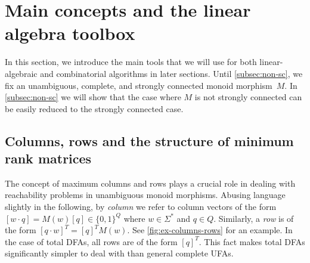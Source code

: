 \documentclass[11pt,a4paper]{amsart}
\theoremstyle{plain}
\theoremstyle{definition}
\theoremstyle{defC}
\theoremstyle{thmC}
\theoremstyle{plain}
\numberwithin{equation}{section}
\begin{document}
\section{Main concepts and the linear algebra toolbox}\label{sec-toolbox}
In this section, we introduce the main tools that we will use for both linear-algebraic and combinatorial algorithms in later sections.
Until \autoref{subsec:non-sc}, we fix an unambiguous, complete, and strongly connected monoid morphism~$M$. In \autoref{subsec:non-sc} we will show that the case where $M$ is not strongly connected can be easily reduced to the strongly connected case.


\subsection{Columns, rows and the structure of minimum rank matrices}\label{subsec:col-row-defs}

The concept of maximum columns and rows plays a crucial role in dealing with reachability problems in unambiguous monoid morphisms. Abusing language slightly in the following, by \emph{column} we refer to column vectors of the form $[w \cdot q] = M(w)[q] \in \{0,1\}^Q$ where $w \in \Sigma^*$ and $q \in Q$.
Similarly, a \emph{row} is of the form $[q \cdot w]^T = [q]^T M(w)$. See \autoref{fig:ex-columns-rows} for an example. In the case of total DFAs, all rows are of the form $[q]^T$. This fact makes total DFAs significantly simpler to deal with than general complete UFAs.
\end{document}
